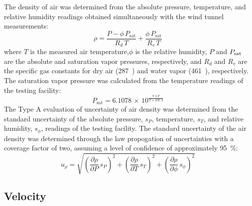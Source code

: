 \documentclass[12pt]{article}
\begin{document}
The density of air was determined from the absolute pressure, temperature, and relative humidity readings obtained simultaneously with the wind tunnel measurements:
\begin{equation}
\rho  =  \frac{P - \phi\,P_{\mathrm{sat}}}{R_d\,T}+\frac{\phi\,P_{\mathrm{sat}}}{R_v\,T}
\end{equation}
where $T$ is the measured air temperature,$\phi$ is the relative humidity, $P$ and $P_{\rm{sat}}$ are the absolute and saturation vapor pressures, respectively, and  $R_d$ and $R_v$ are the specific gas constants for dry air (287~\si{}) and water vapor (461~\si{}), respectively. The saturation vapor pressure was calculated from the temperature readings of the testing facility:
\begin{equation}
P_{\mathrm{sat}} =6.1078\, \times \, 10^{\frac{7.5\,T}{T+237.3}}
\end{equation}
The Type A evaluation of uncertainty of air density was determined from the standard uncertainty of the absolute pressure, $s_{\scriptscriptstyle P}$, temperature, $s_{\scriptscriptstyle T}$, and relative humidity, $s_{\scriptscriptstyle \phi}$, readings of the testing facility. The standard uncertainty of the air density was determined through the law propogation of uncertainties with a coverage factor of two, assuming a level of confidence of approximately 95~\%:
\begin{equation}
\label{eq:Densityuncertainty}
u_{\scriptscriptstyle \rho} = \sqrt{{\left( \frac{\partial \rho}{\partial P}\,s_{\scriptscriptstyle P} \right) }^2+{\left(\frac{\partial \rho}{\partial T}\,s_{\scriptscriptstyle T}\right)}^2+{\left(\frac{\partial \rho}{\partial \phi}\,s_{\scriptscriptstyle \phi}\right)}^2}
\end{equation}


\subsection{Velocity}
\label{ssec:VelUncertainty}
\end{document}
